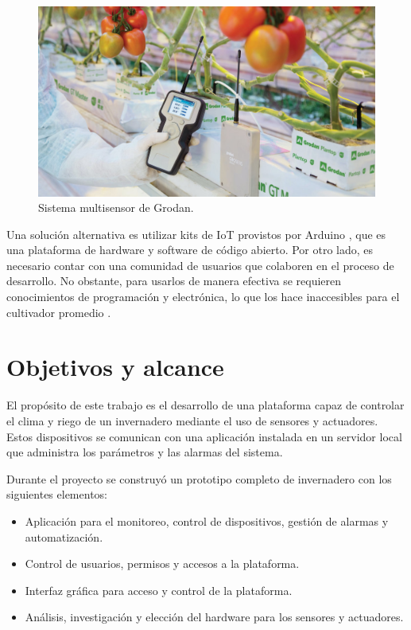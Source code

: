 \begin{figure}[hb]
\centering 
\includegraphics[width=.5\textwidth]{../Figures/grodan.jpg}
\caption[Sistema multisensor de Grodan]{Sistema multisensor de Grodan\protect\footnotemark.}
\label{fig:growlink}
\end{figure}



Una solución alternativa es utilizar kits de IoT provistos por Arduino \citep{arduino}, que es una plataforma de hardware y software de código abierto. Por otro lado, es necesario contar con una comunidad de usuarios que colaboren en el proceso de desarrollo. No obstante, para usarlos de manera efectiva se requieren conocimientos de programación y electrónica, lo que los hace inaccesibles para el cultivador promedio \citep{digger:1}. \\



\section{Objetivos y alcance}
\label{sec:objetivos}

El propósito de este trabajo es el desarrollo de una plataforma capaz de controlar el clima y riego de un invernadero mediante el uso de sensores y actuadores. Estos dispositivos se comunican con una aplicación instalada en un servidor local que administra los parámetros y las alarmas del sistema.

Durante el proyecto se construyó un prototipo completo de invernadero con los siguientes elementos:
 
\begin{itemize}
	\item Aplicación para el monitoreo, control de dispositivos, gestión de alarmas y automatización.
	\item Control de usuarios, permisos y accesos a la plataforma.
	\item Interfaz gráfica para acceso y control de la plataforma.
	\item Análisis, investigación y elección del hardware para los sensores y actuadores.


\end{itemize}


